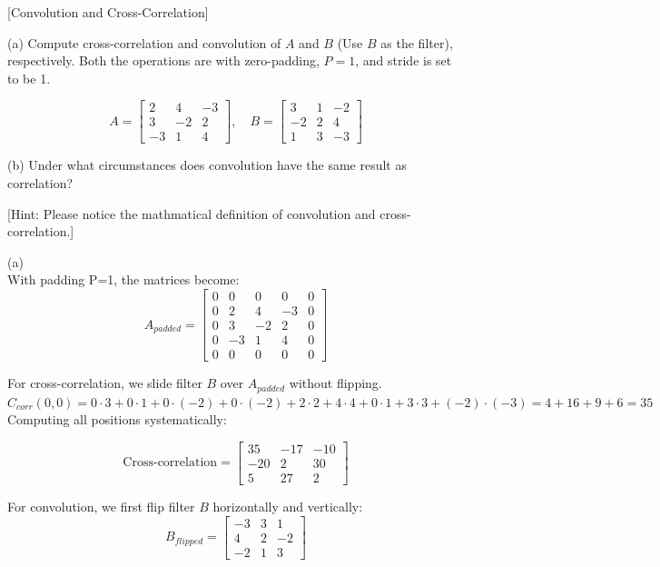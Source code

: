 \item {} [Convolution and Cross-Correlation]

(a) Compute cross-correlation and convolution of $A$ and $B$ (Use $B$ as the filter), respectively. Both the operations are with zero-padding, $P=1$, and stride is set to be 1. 

$$
A=\left[\begin{array}{ccc}
2 & 4 & -3 \\
3 & -2 & 2 \\
-3 & 1 & 4
\end{array}\right], \quad B=\left[\begin{array}{ccc}
3 & 1 & -2 \\
-2 & 2 & 4 \\
1 & 3 & -3
\end{array}\right]
$$

(b) Under what circumstances does convolution have the same result as correlation? 

[Hint: Please notice the mathmatical definition of convolution and cross-correlation.]

\solution

(a)\\
With padding P=1, the matrices become:
$$
A_{padded}=\left[\begin{array}{ccccc}
0 & 0 & 0 & 0 & 0 \\
0 & 2 & 4 & -3 & 0 \\
0 & 3 & -2 & 2 & 0 \\
0 & -3 & 1 & 4 & 0 \\
0 & 0 & 0 & 0 & 0
\end{array}\right]
$$

For cross-correlation, we slide filter $B$ over $A_{padded}$ without flipping.\\

$C_{corr}(0,0) = 0\cdot3 + 0\cdot1 + 0\cdot(-2) + 0\cdot(-2) + 2\cdot2 + 4\cdot4 + 0\cdot1 + 3\cdot3 + (-2)\cdot(-3) = 4 + 16 + 9 + 6 = 35$\\

Computing all positions systematically:

$$
\text{Cross-correlation} = \left[\begin{array}{ccc}
35 & -17 & -10 \\
-20 & 2 & 30 \\
5 & 27 & 2
\end{array}\right]
$$

For convolution, we first flip filter $B$ horizontally and vertically:\\
$$
B_{flipped}=\left[\begin{array}{ccc}
-3 & 3 & 1 \\
4 & 2 & -2 \\
-2 & 1 & 3
\end{array}\right]
$$

